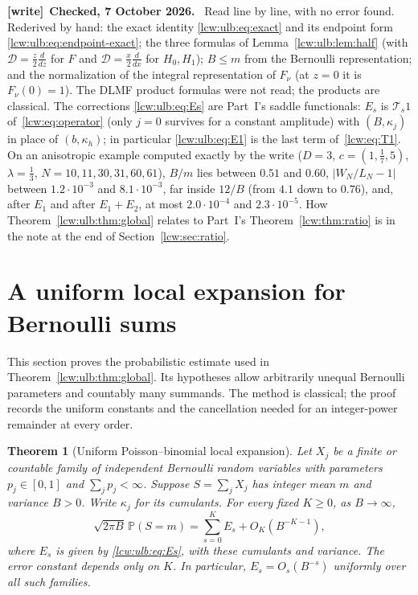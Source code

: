 \documentclass[11pt,letterpaper]{article}
\newtheorem{theorem}{Theorem}[section]
\theoremstyle{remark}\newtheorem{remark}[theorem]{Remark}
\newcommand{\TT}{\mathcal T}\newcommand{\PP}{\mathcal P}
\newenvironment{writenote}[1][]{\par\smallskip\begingroup\small
 \noindent\textbf{[write]}\if\relax\detokenize{#1}\relax\else~\textbf{#1.}\fi\ }%
 {\par\endgroup\smallskip}
\newcommand{\Prob}{\mathbb P}
\newcommand{\Dop}{\mathcal D}
\begin{document}
\begin{writenote}[Checked, 7 October 2026]
Read line by line, with no error found. Rederived by hand: the exact
identity \eqref{lcw:ulb:eq:exact} and its endpoint form
\eqref{lcw:ulb:eq:endpoint-exact}; the three formulas of
Lemma~\ref{lcw:ulb:lem:half} (with $\Dop=\frac z2\frac d{dz}$ for $F$ and
$\Dop=\frac x2\frac d{dx}$ for $H_0,H_1$); $B\le m$ from the Bernoulli
representation; and the normalization of the integral representation of
$F_\nu$ (at $z=0$ it is $F_\nu(0)=1$). The DLMF product formulas were not
read; the products are classical. The corrections \eqref{lcw:ulb:eq:Es} are
Part~I's saddle functionals: $E_s$ is $\TT_s1$ of~\eqref{lcw:eq:operator}
(only $j=0$ survives for a constant amplitude) with $(B,\kappa_j)$ in place of
$(b,\kappa_h)$; in particular \eqref{lcw:ulb:eq:E1} is the last term
of~\eqref{lcw:eq:T1}. On an anisotropic example computed exactly by the write
($D=3$, $c=(1,\tfrac17,5)$, $\lambda=\tfrac13$, $N=10,11,30,31,60,61$), $B/m$
lies between $0.51$ and $0.60$, $|W_N/L_N-1|$ between $1.2\cdot10^{-3}$ and
$8.1\cdot10^{-3}$, far inside $12/B$ (from $4.1$ down to $0.76$), and, after
$E_1$ and after $E_1+E_2$, at most $2.0\cdot10^{-4}$ and $2.3\cdot10^{-5}$.
How Theorem~\ref{lcw:ulb:thm:global} relates to Part~I's
Theorem~\ref{lcw:thm:ratio} is in the note at the end of
Section~\ref{lcw:sec:ratio}.
\end{writenote}

\section{A uniform local expansion for Bernoulli sums}
\label{lcw:ulb:sec:PB}

This section proves the probabilistic estimate used in
Theorem~\ref{lcw:ulb:thm:global}. Its hypotheses allow arbitrarily unequal
Bernoulli parameters and countably many summands. The method is classical;
the proof records the uniform constants and the cancellation needed for
an integer-power remainder at every order.

\begin{theorem}[Uniform Poisson--binomial local expansion]
\label{lcw:ulb:thm:PB}
Let $X_j$ be a finite or countable family of independent Bernoulli random
variables with parameters $p_j\in[0,1]$ and $\sum_jp_j<\infty$.
Suppose $S=\sum_jX_j$ has integer mean $m$ and variance $B>0$.
Write $\kappa_j$ for its cumulants. For every fixed $K\ge0$, as
$B\to\infty$,
\begin{equation}\label{lcw:ulb:eq:PB}
 \sqrt{2\pi B}\,\Prob(S=m)
 =\sum_{s=0}^K E_s+O_K(B^{-K-1}),
\end{equation}
where $E_s$ is given by \eqref{lcw:ulb:eq:Es}, with these cumulants and
variance. The error constant depends only on $K$. In particular,
$E_s=O_s(B^{-s})$ uniformly over all such families.
\end{theorem}
\end{document}
